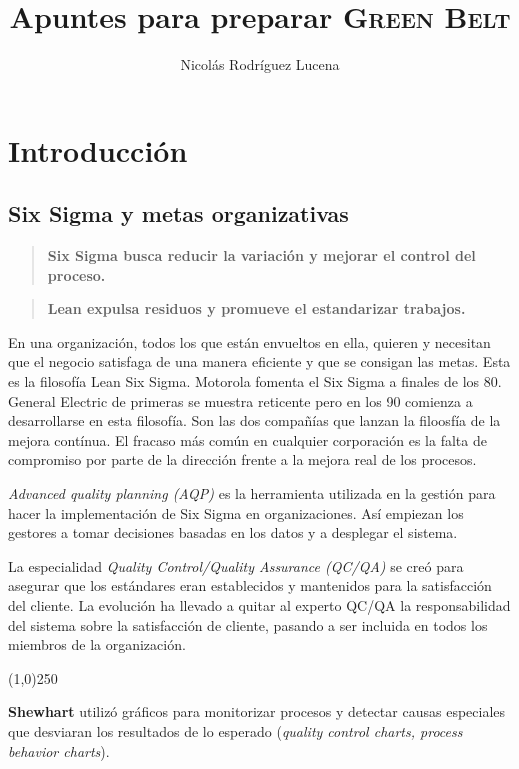 \documentclass[oneside]{book}
\title{Apuntes para preparar \textsc{Green Belt}}
\author{Nicolás Rodríguez Lucena}
\begin{document}
\maketitle
\tableofcontents %
\newpage

\part{Introducción}
\chapter{Six Sigma y metas organizativas}

\begin{quote}
	\textbf{Six Sigma busca reducir la variación y mejorar el control del proceso.}
\end{quote}
\begin{quote}
\textbf{Lean expulsa residuos y promueve el estandarizar trabajos.}
\end{quote}

En una organización, todos los que están envueltos en ella, quieren y necesitan que el negocio satisfaga de una manera eficiente y que se consigan las metas. Esta es la filosofía Lean Six Sigma.
Motorola fomenta el Six Sigma a finales de los 80. General Electric de primeras se muestra reticente pero en los 90 comienza a desarrollarse en esta filosofía. Son las dos compañías que lanzan la filoosfía de la mejora contínua. El fracaso más común en cualquier corporación es la falta de compromiso por parte de la dirección frente a la mejora real de los procesos.

\textit{Advanced quality planning (AQP)} es la herramienta utilizada en la gestión para hacer la implementación de Six Sigma en organizaciones. Así empiezan los gestores a tomar decisiones basadas en los datos y a desplegar el sistema.

La especialidad \textit{Quality Control/Quality Assurance (QC/QA)} se creó para asegurar que los estándares eran establecidos y mantenidos para la satisfacción del cliente. La evolución ha llevado a quitar al experto QC/QA la responsabilidad del sistema sobre la satisfacción de cliente, pasando a ser incluida en todos los miembros de la organización. 

\begin{center}
	\line(1,0){250}
\end{center}

\textbf{Shewhart} utilizó gráficos para monitorizar procesos y detectar causas especiales que desviaran los resultados de lo esperado (\textit{quality control charts, process behavior charts}).
\end{document}
